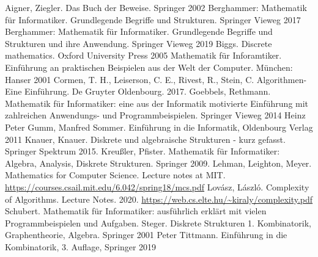 {\tiny }\begin{thebibliography}{AAAA}
	 Aigner, Ziegler. Das Buch der Beweise. Springer 2002
	 Berghammer: Mathematik für Informatiker. Grundlegende Begriffe und Strukturen. Springer Vieweg 2017
	 Berghammer: Mathematik für Informatiker. Grundlegende Begriffe und Strukturen und ihre Anwendung. Springer Vieweg 2019
	 Biggs. Discrete mathematics. Oxford University Press 2005
	 Mathematik für Inforamtiker. Einführung an praktischen Beispielen aus der Welt der Computer. München: Hanser 2001
	 Cormen, T. H., Leiserson, C. E., Rivest, R., Stein, C.  Algorithmen-Eine Einführung. De Gruyter Oldenbourg. 2017. 
	 Goebbels, Rethmann. Mathematik für Informatiker: eine aus der Informatik motivierte Einführung mit zahlreichen Anwendungs- und Programmbeispielen. Springer Vieweg 2014
	 Heinz Peter Gumm, Manfred Sommer. Einführung in die Informatik, Oldenbourg Verlag 2011
	 Knauer, Knauer. Diskrete und algebraische Strukturen - kurz gefasst. Springer Spektrum 2015. 
	 Kreußler, Pfister. Mathematik für Informatiker: Algebra, Analysis, Diskrete Strukturen. Springer 2009. 
	 Lehman, Leighton, Meyer. Mathematics for Computer Science. Lecture notes at MIT. \url{https://courses.csail.mit.edu/6.042/spring18/mcs.pdf} 
	 Lov\'asz, L\'aszl\'o. Complexity of Algorithms. Lecture Notes. 2020. \url{https://web.cs.elte.hu/~kiraly/complexity.pdf} 
	 Schubert. Mathematik für Informatiker: ausführlich erklärt mit vielen Programmbeispielen und Aufgaben.  
	 Steger. Diskrete Strukturen 1. Kombinatorik, Graphentheorie, Algebra. Springer 2001
	 Peter Tittmann. Einführung in die Kombinatorik, 3. Auflage, Springer 2019
\end{thebibliography} 
